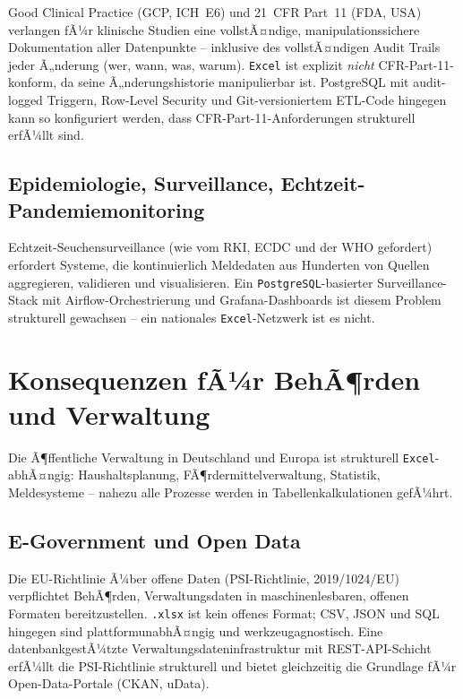 ﻿\documentclass[12pt,a4paper]{report}
\theoremstyle{definition}
\theoremstyle{remark}
\newcommand{\excel}{\texttt{Excel}}
\newcommand{\pg}{\texttt{PostgreSQL}}
\newcommand{\code}[1]{\texttt{#1}}
\begin{document}
Good Clinical Practice (GCP, ICH~E6) und 21~CFR Part~11 (FDA, USA)
verlangen fÃ¼r klinische Studien eine vollstÃ¤ndige,
manipulationssichere Dokumentation aller Datenpunkte -- inklusive
des vollstÃ¤ndigen Audit Trails jeder Ã„nderung (wer, wann, was, warum).
\excel{} ist explizit \emph{nicht} CFR-Part-11-konform, da seine
Ã„nderungshistorie manipulierbar ist.
PostgreSQL mit audit-logged Triggern, Row-Level Security und
Git-versioniertem ETL-Code hingegen kann so konfiguriert werden,
dass CFR-Part-11-Anforderungen strukturell erfÃ¼llt sind.

\subsection{Epidemiologie, Surveillance, Echtzeit-Pandemiemonitoring}

Echtzeit-Seuchensurveillance (wie vom RKI, ECDC und der WHO gefordert)
erfordert Systeme, die kontinuierlich Meldedaten aus Hunderten von
Quellen aggregieren, validieren und visualisieren.
Ein \pg-basierter Surveillance-Stack mit Airflow-Orchestrierung und
Grafana-Dashboards ist diesem Problem strukturell gewachsen --
ein nationales \excel-Netzwerk ist es nicht.

\section{Konsequenzen fÃ¼r BehÃ¶rden und Verwaltung}

Die Ã¶ffentliche Verwaltung in Deutschland und Europa ist strukturell
\excel-abhÃ¤ngig: Haushaltsplanung, FÃ¶rdermittelverwaltung, Statistik,
Meldesysteme -- nahezu alle Prozesse werden in Tabellenkalkulationen
gefÃ¼hrt.

\subsection{E-Government und Open Data}

Die EU-Richtlinie Ã¼ber offene Daten (PSI-Richtlinie,
2019/1024/EU) verpflichtet BehÃ¶rden, Verwaltungsdaten in
maschinenlesbaren, offenen Formaten bereitzustellen.
\code{.xlsx} ist kein offenes Format; CSV, JSON und SQL hingegen sind
plattformunabhÃ¤ngig und werkzeugagnostisch.
Eine datenbankgestÃ¼tzte Verwaltungsdateninfrastruktur mit REST-API-Schicht
erfÃ¼llt die PSI-Richtlinie strukturell und bietet gleichzeitig die
Grundlage fÃ¼r Open-Data-Portale (CKAN, uData).
\end{document}
